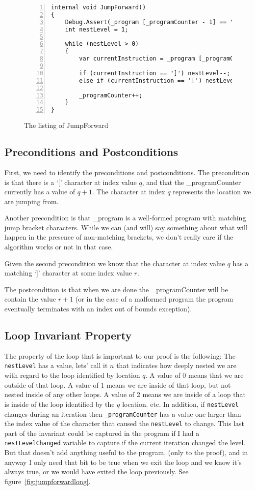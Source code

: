 \documentclass[10pt]{article}
\begin{document}
\begin{figure}
\caption{The listing of JumpForward}
\label{fig:jumpforward}
\begin{lstlisting}[numbers=left]
internal void JumpForward()
{
    Debug.Assert(_program [_programCounter - 1] == '[');
    int nestLevel = 1;

    while (nestLevel > 0)
    {
        var currentInstruction = _program [_programCounter];
        
        if (currentInstruction == ']') nestLevel--;
        else if (currentInstruction == '[') nestLevel++;
        
        _programCounter++;
    }
}
\end{lstlisting}
\end{figure}

\subsection*{Preconditions and Postconditions}
First, we need to identify the preconditions and postconditions. The 
precondition is that there is a `[' character at index value $q$,
and that the \_programCounter currently has a value of $q+1$. The
character at index $q$ represents the location we are jumping from.

Another precondition is that \_program is a well-formed program with
matching jump bracket characters. While we can (and will) say something
about what will happen in the presence of non-matching brackets, we
don't really care if the algorithm works or not in that case.

Given the second precondition we know that the character at index value
$q$ has a matching `]' character at some index value $r$.

The postcondition is that when we are done the \_programCounter will
be contain the value $r+1$ (or in the case of a malformed program
the program eventually terminates with an index out of bounds exception).

\subsection*{Loop Invariant Property}
The property of the loop that is important to our proof is the following: The
\verb!nestLevel! has a value, lets' call it $n$ that indicates how deeply
nested we are with regard to the loop identified by location $q$. A value of 0
means that we are outside of that loop. A value of 1 means we are inside of
that loop, but not nested inside of any other loops. A value of 2 means we are
inside of a loop that is inside of the loop identified by the $q$ location.
etc. In addition, if \verb!nestLevel! changes during an iteration then
\verb!_programCounter! has a value one larger than the index value
of the character that caused the \verb!nestLevel! to change. This last
part of the invariant could be captured in the program if I had a 
\verb!nestLevelChanged! variable to capture if the current iteration
changed the level. But that doesn't add anything useful to the program,
(only to the proof), and in anyway I only need that bit to be true
when we exit the loop and we know it's always true, or we would
have exited the loop previously. See figure~\ref{fig:jumpforwardlong}.
\end{document}
